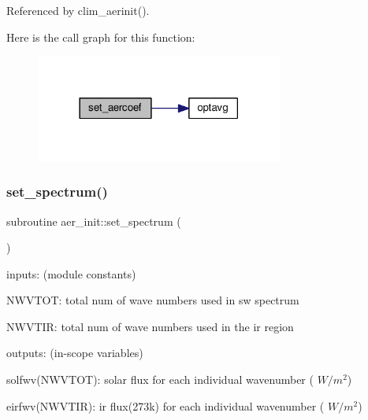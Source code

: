 Referenced by clim\+\_\+aerinit().

Here is the call graph for this function\+:\nopagebreak
\begin{figure}[H]
\begin{center}
\leavevmode
\includegraphics[width=230pt]{group__module__radiation__aerosols_ga95fabbc4272ae70f3b345f9b1a898d46_cgraph}
\end{center}
\end{figure}
\mbox{\label{group__module__radiation__aerosols_gaa7fe6dc2964bc474a132b93aaab82cb0}} 
\subsubsection{\texorpdfstring{set\+\_\+spectrum()}{set\_spectrum()}}
{\footnotesize\ttfamily subroutine aer\+\_\+init\+::set\+\_\+spectrum (\begin{DoxyParamCaption}{ }\end{DoxyParamCaption})\hspace{0.3cm}{\ttfamily [private]}}


\begin{DoxyItemize}
\item inputs\+: (module constants)
\begin{DoxyItemize}
\item N\+W\+V\+T\+OT\+: total num of wave numbers used in sw spectrum
\item N\+W\+V\+T\+IR\+: total num of wave numbers used in the ir region
\end{DoxyItemize}
\item outputs\+: (in-\/scope variables)
\begin{DoxyItemize}
\item solfwv(\+N\+W\+V\+T\+O\+T)\+: solar flux for each individual wavenumber ( $W/m^2$)
\item eirfwv(\+N\+W\+V\+T\+I\+R)\+: ir flux(273k) for each individual wavenumber ( $W/m^2$) 
\end{DoxyItemize}
\end{DoxyItemize}


